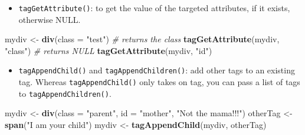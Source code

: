 \documentclass[]{book}
\newenvironment{Shaded}{\begin{snugshade}}{\end{snugshade}}
\newcommand{\CommentTok}[1]{\textcolor[rgb]{0.56,0.35,0.01}{\textit{#1}}}
\newcommand{\DataTypeTok}[1]{\textcolor[rgb]{0.13,0.29,0.53}{#1}}
\newcommand{\KeywordTok}[1]{\textcolor[rgb]{0.13,0.29,0.53}{\textbf{#1}}}
\newcommand{\NormalTok}[1]{#1}
\newcommand{\OperatorTok}[1]{\textcolor[rgb]{0.81,0.36,0.00}{\textbf{#1}}}
\newcommand{\StringTok}[1]{\textcolor[rgb]{0.31,0.60,0.02}{#1}}
\providecommand{\tightlist}{%
  \setlength{\itemsep}{0pt}\setlength{\parskip}{0pt}}
\begin{document}
\begin{Shaded}
\end{Shaded}

\begin{itemize}
\tightlist
\item
  \texttt{tagGetAttribute()}: to get the value of the targeted attributes, if it exists, otherwise NULL.
\end{itemize}

\begin{Shaded}
\begin{Highlighting}[]
\NormalTok{mydiv <-}\StringTok{ }\KeywordTok{div}\NormalTok{(}\DataTypeTok{class =} \StringTok{"test"}\NormalTok{)}
\CommentTok{# returns the class}
\KeywordTok{tagGetAttribute}\NormalTok{(mydiv, }\StringTok{"class"}\NormalTok{)}
\CommentTok{# returns NULL}
\KeywordTok{tagGetAttribute}\NormalTok{(mydiv, }\StringTok{"id"}\NormalTok{)}
\end{Highlighting}
\end{Shaded}

\begin{itemize}
\tightlist
\item
  \texttt{tagAppendChild()} and \texttt{tagAppendChildren()}: add other tags to an existing tag.
  Whereas \texttt{tagAppendChild()} only takes on tag, you can pass a list of tags to \texttt{tagAppendChildren()}.
\end{itemize}

\begin{Shaded}
\begin{Highlighting}[]
\NormalTok{mydiv <-}\StringTok{ }\KeywordTok{div}\NormalTok{(}\DataTypeTok{class =} \StringTok{"parent"}\NormalTok{, }\DataTypeTok{id =} \StringTok{"mother"}\NormalTok{, }\StringTok{"Not the mama!!!"}\NormalTok{)}
\NormalTok{otherTag <-}\StringTok{ }\KeywordTok{span}\NormalTok{(}\StringTok{"I am your child"}\NormalTok{)}
\NormalTok{mydiv <-}\StringTok{ }\KeywordTok{tagAppendChild}\NormalTok{(mydiv, otherTag)}
\end{Highlighting}
\end{Shaded}
\end{document}
